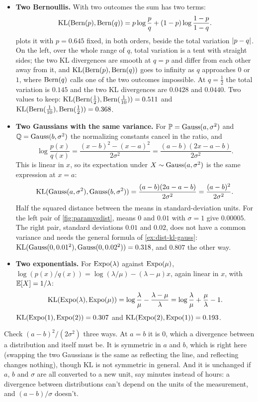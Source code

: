 \begin{worked}
\begin{itemize}
\item \textbf{Two Bernoullis.} With two outcomes the sum has two terms:
\[
\mathrm{KL}(\text{Bern}(p), \text{Bern}(q)) = p \log \frac{p}{q} + (1 - p) \log \frac{1 - p}{1 - q}.
\]
 plots it with $p = 0.645$ fixed, in both orders, beside the total variation $\lvert p - q\rvert$.
On the left, over the whole range of $q$, total variation is a tent with straight sides; the two KL divergences are smooth at $q = p$ and differ from each other away from it, and $\mathrm{KL}(\text{Bern}(p), \text{Bern}(q))$ goes to infinity as $q$ approaches $0$ or $1$, where $\text{Bern}(q)$ calls one of the two outcomes impossible.
At $q = \frac12$ the total variation is $0.145$ and the two KL divergences are $0.0428$ and $0.0440$.
Two values to keep: $\mathrm{KL}(\text{Bern}(\frac12), \text{Bern}(\frac1{10})) = 0.511$ and $\mathrm{KL}(\text{Bern}(\frac1{10}), \text{Bern}(\frac12)) = 0.368$.
\item \textbf{Two Gaussians with the same variance.} For $\mathbb{P} = \text{Gauss}(a, \sigma^2)$ and $\mathbb{Q} = \text{Gauss}(b, \sigma^2)$ the normalizing constants cancel in the ratio, and
\[
\log \frac{p(x)}{q(x)} = \frac{(x - b)^2 - (x - a)^2}{2\sigma^2} = \frac{(a - b)(2x - a - b)}{2\sigma^2}.
\]
This is linear in $x$, so its expectation under $X \sim \text{Gauss}(a, \sigma^2)$ is the same expression at $x = a$:
\[
\mathrm{KL}(\text{Gauss}(a, \sigma^2), \text{Gauss}(b, \sigma^2)) = \frac{(a - b)(2a - a - b)}{2\sigma^2} = \frac{(a - b)^2}{2\sigma^2}.
\]
Half the squared distance between the means in standard-deviation units. For the left pair of \cref{fig:paramvsdist}, means $0$ and $0.01$ with $\sigma = 1$ give $0.00005$. The right pair, standard deviations $0.01$ and $0.02$, does not have a common variance and needs the general formula of \cref{ex:dist-kl-gauss}: $\mathrm{KL}(\text{Gauss}(0, 0.01^2), \text{Gauss}(0, 0.02^2)) = 0.318$, and $0.807$ the other way.
\item \textbf{Two exponentials.} For $\text{Expo}(\lambda)$ against $\text{Expo}(\mu)$, $\log(p(x)/q(x)) = \log(\lambda/\mu) - (\lambda - \mu)x$, again linear in $x$, with $\operatorname*{\mathbb{E}}[X] = 1/\lambda$:
\[
\mathrm{KL}(\text{Expo}(\lambda), \text{Expo}(\mu)) = \log \frac{\lambda}{\mu} - \frac{\lambda - \mu}{\lambda} = \log\frac{\lambda}{\mu} + \frac{\mu}{\lambda} - 1.
\]
$\mathrm{KL}(\text{Expo}(1), \text{Expo}(2)) = 0.307$ and $\mathrm{KL}(\text{Expo}(2), \text{Expo}(1)) = 0.193$.
\end{itemize}
\end{worked}

\begin{sanitycheck}
Check $(a - b)^2/(2\sigma^2)$ three ways.
At $a = b$ it is $0$, which a divergence between a distribution and itself must be.
It is symmetric in $a$ and $b$, which is right here (swapping the two Gaussians is the same as reflecting the line, and reflecting changes nothing), though KL is not symmetric in general.
And it is unchanged if $a$, $b$ and $\sigma$ are all converted to a new unit, say minutes instead of hours: a divergence between distributions can't depend on the units of the measurement, and $(a - b)/\sigma$ doesn't.
\end{sanitycheck}

